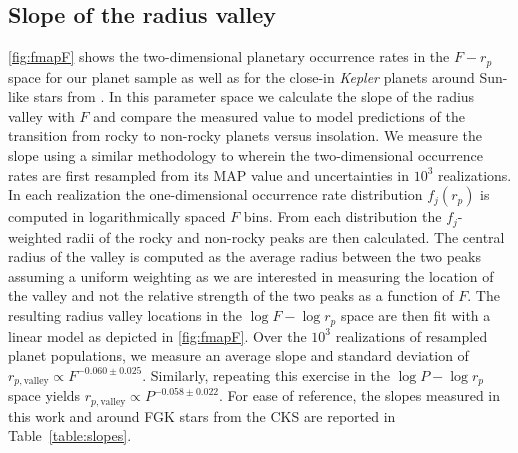 \documentclass[twocolumn]{emulateapj}
\newcommand{\kepler}[1]{\emph{Kepler}#1}
\begin{document}
\subsection{Slope of the radius valley}
\autoref{fig:fmapF} shows the two-dimensional planetary occurrence rates in the $F-r_p$ space for
our planet sample as well as for the close-in \kepler{} planets around Sun-like stars
from \cite{martinez19}.
In this parameter space we calculate the slope of the radius valley with $F$ and compare the measured
value to model predictions of the transition from rocky to non-rocky planets
versus insolation. We measure the slope using a similar methodology to \cite{martinez19} wherein
the two-dimensional occurrence rates are first resampled from its MAP value and uncertainties in
$10^3$ realizations. In each realization the
one-dimensional occurrence rate distribution $f_j(r_p)$ is computed in logarithmically spaced $F$
bins. From each distribution the $f_j$-weighted radii of the rocky and non-rocky peaks are then calculated.
The central radius of the valley is computed as the average radius between the two peaks
assuming a uniform weighting as we are interested in measuring the location of the valley and not the relative
strength of the two peaks as a function of $F$. The resulting radius valley locations in the $\log{F}-\log{r_p}$
space are then fit with a linear model as depicted in \autoref{fig:fmapF}. 
Over the $10^3$ realizations of resampled planet
populations, we measure an average slope and standard deviation of
$r_{p,\text{valley}} \propto F^{-0.060\pm 0.025}$. Similarly, repeating this exercise in the $\log{P}-\log{r_p}$
space yields $r_{p,\text{valley}} \propto P^{-0.058\pm 0.022}$. For ease of reference, the slopes measured
in this work and around FGK stars from the CKS \citep{martinez19} are reported in
Table~\autoref{table:slopes}.


\end{document}
